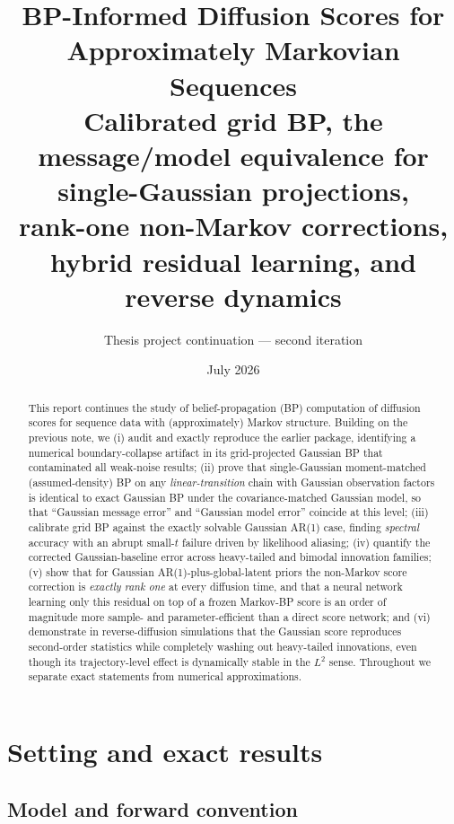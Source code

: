 \documentclass[11pt]{article}
\title{BP-Informed Diffusion Scores for Approximately Markovian Sequences\\
\large Calibrated grid BP, the message/model equivalence for single-Gaussian projections,\\
rank-one non-Markov corrections, hybrid residual learning, and reverse dynamics}
\author{Thesis project continuation --- second iteration}
\date{July 2026}
\begin{document}
\maketitle

\begin{abstract}
This report continues the study of belief-propagation (BP) computation of diffusion
scores for sequence data with (approximately) Markov structure. Building on the
previous note, we (i) audit and exactly reproduce the earlier package, identifying a
numerical boundary-collapse artifact in its grid-projected Gaussian BP that
contaminated all weak-noise results; (ii) prove that single-Gaussian moment-matched
(assumed-density) BP on any \emph{linear-transition} chain with Gaussian observation
factors is identical to exact Gaussian BP under the covariance-matched Gaussian model,
so that ``Gaussian message error'' and ``Gaussian model error'' coincide at this level;
(iii) calibrate grid BP against the exactly solvable Gaussian AR(1) case, finding
\emph{spectral} accuracy with an abrupt small-$t$ failure driven by likelihood
aliasing; (iv) quantify the corrected Gaussian-baseline error across heavy-tailed and
bimodal innovation families; (v) show that for Gaussian AR(1)-plus-global-latent priors
the non-Markov score correction is \emph{exactly rank one} at every diffusion time, and
that a neural network learning only this residual on top of a frozen Markov-BP score is
an order of magnitude more sample- and parameter-efficient than a direct score network;
and (vi) demonstrate in reverse-diffusion simulations that the Gaussian score
reproduces second-order statistics while completely washing out heavy-tailed
innovations, even though its trajectory-level effect is dynamically stable in the
$L^2$ sense. Throughout we separate exact statements from numerical approximations.
\end{abstract}

\tableofcontents
\newpage

\section{Setting and exact results}

\subsection{Model and forward convention}
\end{document}
